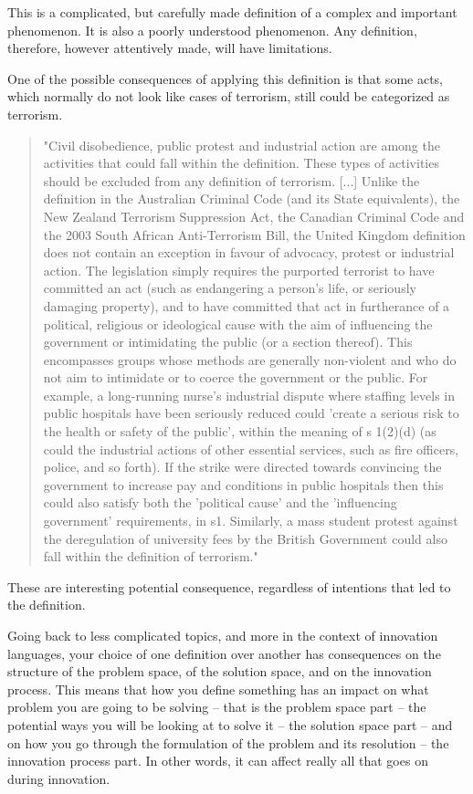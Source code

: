 This is a complicated, but carefully made definition of a complex and important phenomenon. It is also a poorly understood phenomenon. Any definition, therefore, however attentively made, will have limitations.

One of the possible consequences of applying this definition is that some acts, which normally do not look like cases of terrorism, still could be categorized as terrorism.

\begin{quote}
"Civil disobedience, public protest and industrial action are among the activities that could fall within the definition. These types of activities should be excluded from any definition of terrorism. [...] Unlike the definition in the Australian Criminal Code (and its State equivalents), the New Zealand Terrorism Suppression Act, the Canadian Criminal Code and the 2003 South African Anti-Terrorism Bill, the United Kingdom definition does not contain an exception in favour of advocacy, protest or industrial action. The legislation simply requires the purported terrorist to have committed an act (such as endangering a person's life, or seriously damaging property), and to have committed that act in furtherance of a political, religious or ideological cause with the aim of influencing the government or intimidating the public (or a section thereof). This encompasses groups whose methods are generally non-violent and who do not aim to intimidate or to coerce the government or the public. For example, a long-running nurse's industrial dispute where staffing levels in public hospitals have been seriously reduced could 'create a serious risk to the health or safety of the public', within the meaning of s 1(2)(d) (as could the industrial actions of other essential services, such as fire officers, police, and so forth). If the strike were directed towards convincing the government to increase pay and conditions in public hospitals then this could also satisfy both the 'political cause' and the 'influencing government' requirements, in s1. Similarly, a mass student protest against the deregulation of university fees by the British Government could also fall within the definition of terrorism." \cite{golder2004terrorism}
\end{quote}

These are interesting potential consequence, regardless of intentions that led to the definition.

Going back to less complicated topics, and more in the context of innovation languages, your choice of one definition over another has consequences on the structure of the problem space, of the solution space, and on the innovation process. This means that how you define something has an impact on what problem you are going to be solving -- that is the problem space part -- the potential ways you will be looking at to solve it -- the solution space part -- and on how you go through the formulation of the problem and its resolution -- the innovation process part. In other words, it can affect really all that goes on during innovation.

